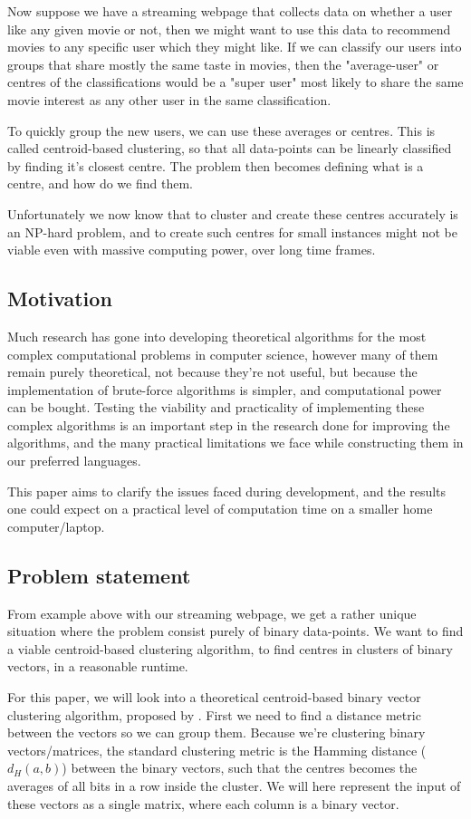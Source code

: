 \documentclass[a4paper]{article}
\begin{document}
Now suppose we have a streaming webpage that collects data on whether a user like any given movie or not,
then we might want to use this data to recommend movies to any specific user which they might like.
If we can classify our users into groups that share mostly the same taste in movies, then
the "average-user" or centres of the classifications would be a "super user" most likely to share the same movie
interest as any other user in the same classification.

To quickly group the new users, we can use these averages or centres. This is called centroid-based
clustering, so that all data-points can be linearly classified by finding it's closest centre.
The problem then becomes defining what is a centre, and how do we find them.

Unfortunately we now know that to cluster and create these centres accurately is an NP-hard problem,
and to create such centres for small instances might not be viable even with massive computing power,
over long time frames.

\subsection{Motivation}
Much research has gone into developing theoretical algorithms for the most complex computational
problems in computer science, however many of them remain purely theoretical, not because
they're not useful, but because the implementation of brute-force algorithms is simpler, and
computational power can be bought. Testing the viability and practicality of implementing
these complex algorithms is an important step in the research done for improving the
algorithms, and the many practical limitations we face while constructing them in our
preferred languages.

This paper aims to clarify the issues faced during development, and the results one could expect
on a practical level of computation time on a smaller home computer/laptop.

\subsection{Problem statement}
From example above with our streaming webpage, we get a rather unique situation where the problem consist
purely of binary data-points. We want to find a viable centroid-based clustering algorithm, to find
centres in clusters of binary vectors, in a reasonable runtime.

For this paper, we will look into a theoretical centroid-based binary vector clustering algorithm, proposed
by \cite{fomin_golovach_panolan_2020}. First we need to find a distance metric between the vectors so we
can group them. Because we're clustering binary vectors/matrices, the standard clustering metric is
the Hamming distance (\textit{$d_H(a, b)$}) between the binary vectors, such that the centres
becomes the averages of all bits in a row inside the cluster. We will here represent the input of these
vectors as a single matrix, where each column is a binary vector.
\end{document}
